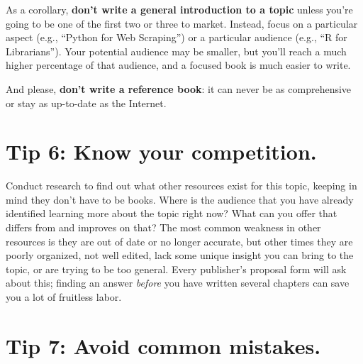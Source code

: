 \documentclass[10pt,letterpaper]{article}
\begin{document}
As a corollary,
\textbf{don't write a general introduction to a topic}
unless you're going to be one of the first two or three to market.
Instead,
focus on a particular aspect (e.g., ``Python for Web Scraping'')
or a particular audience (e.g., ``R for Librarians'').
Your potential audience may be smaller,
but you'll reach a much higher percentage of that audience,
and a focused book is much easier to write.

And please, \textbf{don't write a reference book}:
it can never be as comprehensive or stay as up-to-date as the Internet.

\section*{Tip 6: Know your competition.}

Conduct research to find out what other resources exist for this topic,
keeping in mind they don't have to be books.
Where is the audience that you have already identified learning more about the topic right now?
What can you offer that differs from and improves on that?
The most common weakness in other resources is they are out of date or no longer accurate,
but other times they are poorly organized,
not well edited,
lack some unique insight you can bring to the topic,
or are trying to be too general.
Every publisher's proposal form will ask about this;
finding an answer \emph{before} you have written several chapters
can save you a lot of fruitless labor.

\section*{Tip 7: Avoid common mistakes.}
\end{document}
